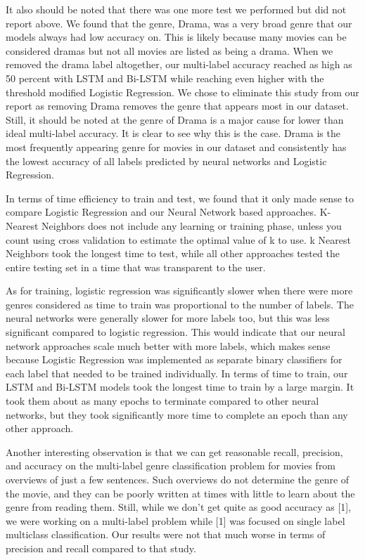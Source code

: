 \documentclass[sigconf]{acmart}
\begin{document}
It also should be noted that there was one more test we performed but did not report above. We found that the genre, Drama, was a very broad genre that our models always had low accuracy on. This is likely because many movies can be considered dramas but not all movies are listed as being a drama. When we removed the drama label altogether, our multi-label accuracy reached as high as 50 percent with LSTM and Bi-LSTM while reaching even higher with the threshold modified Logistic Regression.  We chose to eliminate this study from our report as removing Drama removes the genre that appears most in our dataset.  Still, it should be noted at the genre of Drama is a major cause for lower than ideal multi-label accuracy.  It is clear to see why this is the case.  Drama is the most frequently appearing genre for movies in our dataset and consistently has the lowest accuracy of all labels predicted by neural networks and Logistic Regression. 

In terms of time efficiency to train and test, we found that it only made sense to compare Logistic Regression and our Neural Network based approaches. K-Nearest Neighbors does not include any learning or training phase, unless you count using cross validation to estimate the optimal value of k to use. k Nearest Neighbors took the longest time to test, while all other approaches tested the entire testing set in a time that was transparent to the user. 

As for training, logistic regression was significantly slower when there were more genres considered as time to train was proportional to the number of labels.  The neural networks were generally slower for more labels too, but this was less significant compared to logistic regression. This would indicate that our neural network approaches scale much better with more labels, which makes sense because Logistic Regression was implemented as separate binary classifiers for each label that needed to be trained individually. In terms of time to train, our LSTM and Bi-LSTM models took the longest time to train by a large margin. It took them about as many epochs to terminate compared to other neural networks, but they took significantly more time to complete an epoch than any other approach. 

Another interesting observation is that we can get reasonable recall, precision, and accuracy on the multi-label genre classification problem for movies from overviews of just a few sentences.  Such overviews do not determine the genre of the movie, and they can be poorly written at times with little to learn about the genre from reading them. Still, while we don't get quite as good accuracy as [1], we were working on a multi-label problem while [1] was focused on single label multiclass classification. Our results were not that much worse in terms of precision and recall compared to that study.
\end{document}
